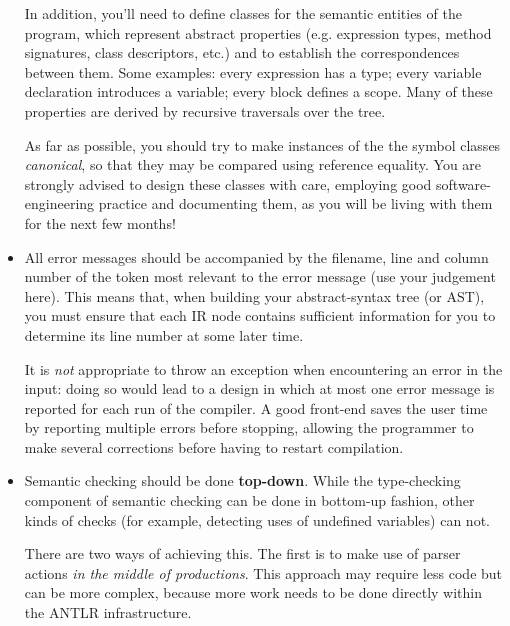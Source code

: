 \begin{itemize}
In addition, you'll need to define classes for the semantic entities
of the program, which represent abstract properties (e.g. expression
types, method signatures, class descriptors, etc.) and to establish
the correspondences between them.  Some examples: every expression has
a type; every variable declaration introduces a variable; every block
defines a scope.  Many of these properties are derived by recursive
traversals over the tree.

As far as possible, you should try to make instances of the the symbol
classes {\it canonical}, so that they may be compared using reference
equality.  You are strongly advised to design these classes with care,
employing good software-engineering practice and documenting them, as
you will be living with them for the next few months!

\item
All error messages should be accompanied by the filename, line and
column number of the token most relevant to the error message (use
your judgement here).  This means that, when building your
abstract-syntax tree (or AST), you must ensure that each IR node
contains sufficient information for you to determine its line number
at some later time.


It is {\it not} appropriate to throw an exception when encountering an
error in the input: doing so would lead to a design in which at most
one error message is reported for each run of the compiler.  A good
front-end saves the user time by reporting multiple errors before
stopping, allowing the programmer to make several corrections before
having to restart compilation.

\item
Semantic checking should be done {\bf top-down}. While the
type-checking component of semantic checking can be done in
bottom-up fashion, other kinds of checks (for example, detecting
uses of undefined variables) can not.

There are two ways of achieving this. The first is to make use of
parser actions {\it in the middle of productions}. This approach may
require less code but can be more complex, because more work needs
to be done directly within the ANTLR infrastructure.


\end{itemize}
